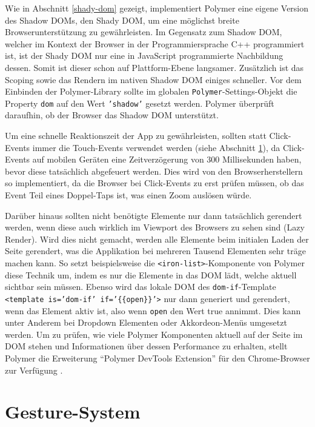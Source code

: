 Wie in Abschnitt \ref{shady-dom} gezeigt, implementiert Polymer eine eigene Version des Shadow \ac{DOM}s, den Shady \ac{DOM}, um eine möglichst breite Browserunterstützung zu gewährleisten. Im Gegensatz zum Shadow \ac{DOM}, welcher im Kontext der Browser in der Programmiersprache C++ programmiert ist, ist der Shady \ac{DOM} nur eine in JavaScript programmierte Nachbildung dessen. Somit ist dieser schon auf Plattform-Ebene langsamer. Zusätzlich ist das Scoping sowie das Rendern im nativen Shadow \ac{DOM} einiges schneller. Vor dem Einbinden der Polymer-Library sollte im globalen \texttt{Polymer}-Settings-Objekt die Property \texttt{dom} auf den Wert \texttt{'shadow'} gesetzt werden. Polymer überprüft daraufhin, ob der Browser das Shadow \ac{DOM} unterstützt.

Um eine schnelle Reaktionszeit der App zu gewährleisten, sollten statt Click-Events immer die Touch-Events verwendet werden (siehe Abschnitt \ref{gesture-system}), da Click-Events auf mobilen Geräten eine Zeitverzögerung von 300 Millisekunden haben, bevor diese tatsächlich abgefeuert werden. Dies wird von den Browserherstellern so implementiert, da die Browser bei Click-Events zu erst prüfen müssen, ob das Event Teil eines Doppel-Taps ist, was einen Zoom auslösen würde.

Darüber hinaus sollten nicht benötigte Elemente nur dann tatsächlich gerendert werden, wenn diese auch wirklich im Viewport des Browsers zu sehen sind (Lazy Render). Wird dies nicht gemacht, werden alle Elemente beim initialen Laden der Seite gerendert, was die Applikation bei mehreren Tausend Elementen sehr träge machen kann. So setzt beispielsweise die \texttt{\textless{}iron-list\textgreater{}}-Komponente von Polymer diese Technik um, indem es nur die Elemente in das \ac{DOM} lädt, welche aktuell sichtbar sein müssen. Ebenso wird das lokale \ac{DOM} des \texttt{dom-if}-Template \texttt{\textless{}template\ is='dom-if'\ if='\{\{open\}\}'\textgreater{}} nur dann generiert und gerendert, wenn das Element aktiv ist, also wenn \texttt{open} den Wert true annimmt. Dies kann unter Anderem bei Dropdown Elementen oder Akkordeon-Menüs umgesetzt werden. Um zu prüfen, wie viele Polymer Komponenten aktuell auf der Seite im \ac{DOM} stehen und Informationen über dessen Performance zu erhalten, stellt Polymer die Erweiterung ``Polymer DevTools Extension'' für den Chrome-Browser zur Verfügung \cite{citeulike:13915202}.


\section{Gesture-System}\label{gesture-system}

